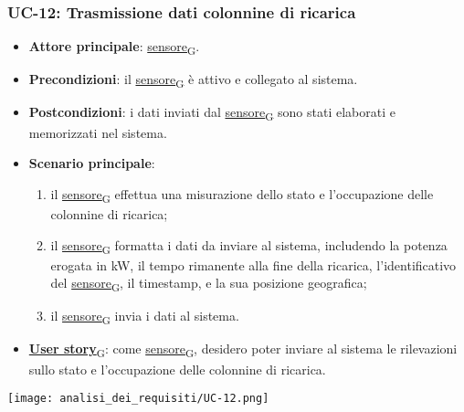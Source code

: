 \subsubsection{UC-12: Trasmissione dati colonnine di ricarica}
\begin{itemize}
	\item \textbf{Attore principale}: \href{https://7last.github.io/docs/pb/documentazione-interna/glossario\#sensore}{sensore\textsubscript{G}}.
	\item \textbf{Precondizioni}: il \href{https://7last.github.io/docs/pb/documentazione-interna/glossario\#sensore}{sensore\textsubscript{G}} è attivo e collegato al sistema.
	\item \textbf{Postcondizioni}: i dati inviati dal \href{https://7last.github.io/docs/pb/documentazione-interna/glossario\#sensore}{sensore\textsubscript{G}} sono stati elaborati e memorizzati nel sistema.
	\item \textbf{Scenario principale}:
	      \begin{enumerate}
		      \item il \href{https://7last.github.io/docs/pb/documentazione-interna/glossario\#sensore}{sensore\textsubscript{G}} effettua una misurazione dello stato e l'occupazione delle colonnine di ricarica;
		      \item il \href{https://7last.github.io/docs/pb/documentazione-interna/glossario\#sensore}{sensore\textsubscript{G}} formatta i dati da inviare al sistema, includendo la potenza erogata in kW, il tempo rimanente alla fine della ricarica, l'identificativo del \href{https://7last.github.io/docs/pb/documentazione-interna/glossario\#sensore}{sensore\textsubscript{G}},
		            il timestamp, e la sua posizione geografica;
		      \item il \href{https://7last.github.io/docs/pb/documentazione-interna/glossario\#sensore}{sensore\textsubscript{G}} invia i dati al sistema.
	      \end{enumerate}
	\item \href{https://7last.github.io/docs/pb/documentazione-interna/glossario\#user-story}{\textbf{User story}\textsubscript{G}}:
	      come \href{https://7last.github.io/docs/pb/documentazione-interna/glossario\#sensore}{sensore\textsubscript{G}}, desidero poter inviare al sistema le rilevazioni sullo stato e l'occupazione delle colonnine di ricarica.
\end{itemize}
\begin{center}
	\texttt{[image: analisi\_dei\_requisiti/UC-12.png]}
\end{center}

